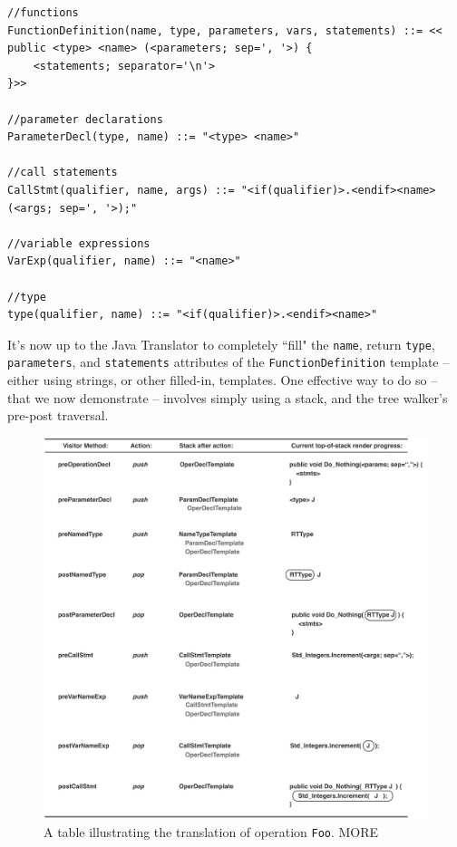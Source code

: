 \documentclass[times]{speauth}
\begin{document}
\begin{lstlisting}[caption={Templates required for translation of our example. Note: Templates wrapped by ``\texttt{<<..>>}" indicate that whitespace, newlines, and tabs are to be preserved.},label={listing:required_templates}]
//functions
FunctionDefinition(name, type, parameters, vars, statements) ::= <<			
public <type> <name> (<parameters; sep=', '>) {
	<statements; separator='\n'>
}>>

//parameter declarations
ParameterDecl(type, name) ::= "<type> <name>"

//call statements
CallStmt(qualifier, name, args) ::= "<if(qualifier)>.<endif><name>(<args; sep=', '>);"

//variable expressions
VarExp(qualifier, name) ::= "<name>"

//type
type(qualifier, name) ::= "<if(qualifier)>.<endif><name>"
\end{lstlisting}

It's now up to the Java Translator to completely ``fill" the \texttt{name}, return \texttt{type}, \texttt{parameters}, and \texttt{statements} attributes of the \texttt{FunctionDefinition} template -- either using strings, or other filled-in, templates. One effective way to do so -- that we now demonstrate -- involves simply using a stack, and the tree walker's pre-post traversal.

\begin{figure}
\centering
\includegraphics[scale=.50]{figures/translation_table.pdf}
\caption{A table illustrating the translation of operation \texttt{Foo}. MORE}
\label{fig:translation_flow}
\end{figure}
\end{document}
